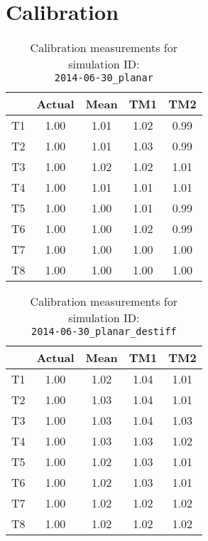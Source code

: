 
\section*{Calibration}

\begin{table}[H]
\centering
\cprotect\caption{Calibration measurements for simulation ID:\\
\verb|2014-06-30_planar|}
\begin{tabular}{|c|c|c|c|c|} \hline
~ & Actual & Mean & TM1 & TM2 \\ \hline
T1 & 1.00 & 1.01 & 1.02 & 0.99 \\
T2 & 1.00 & 1.01 & 1.03 & 0.99 \\
T3 & 1.00 & 1.02 & 1.02 & 1.01 \\
T4 & 1.00 & 1.01 & 1.01 & 1.01 \\
T5 & 1.00 & 1.00 & 1.01 & 0.99 \\
T6 & 1.00 & 1.00 & 1.02 & 0.99 \\
T7 & 1.00 & 1.00 & 1.00 & 1.00 \\
T8 & 1.00 & 1.00 & 1.00 & 1.00 \\ \hline
\end{tabular}
\label{calib-1}
\end{table}

\begin{table}[H]
\centering
\cprotect\caption{Calibration measurements for simulation ID:\\
\verb|2014-06-30_planar_destiff|}
\begin{tabular}{|c|c|c|c|c|} \hline
~ & Actual & Mean & TM1 & TM2 \\ \hline
T1 & 1.00 & 1.02 & 1.04 & 1.01 \\
T2 & 1.00 & 1.03 & 1.04 & 1.01 \\
T3 & 1.00 & 1.03 & 1.04 & 1.03 \\
T4 & 1.00 & 1.03 & 1.03 & 1.02 \\
T5 & 1.00 & 1.02 & 1.03 & 1.01 \\
T6 & 1.00 & 1.02 & 1.03 & 1.01 \\
T7 & 1.00 & 1.02 & 1.02 & 1.02 \\
T8 & 1.00 & 1.02 & 1.02 & 1.02 \\ \hline
\end{tabular}
\label{calib-2}
\end{table}

